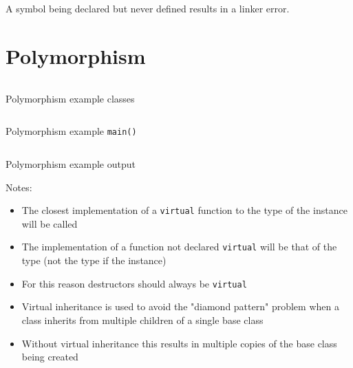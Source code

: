 \documentclass[a4paper]{article}
\begin{document}
A symbol being declared but never defined results in a linker error.

\section{Polymorphism}

\begin{listing}[h!]
  \inputminted[linenos,frame=lines,firstline=5,lastline=39]{cpp}{listings/polymorphism_1.cpp}
  \caption{Polymorphism example classes}
  \label{listing:polymorphism_1}
\end{listing}
\FloatBarrier

\begin{listing}[h!]
  \inputminted[linenos,frame=lines,firstline=41]{cpp}{listings/polymorphism_1.cpp}
  \caption{Polymorphism example \texttt{main()}}
  \label{listing:polymorphism_1_main}
\end{listing}
\FloatBarrier

\begin{listing}[h!]
  \inputminted[linenos,frame=lines]{text}{out/polymorphism_1.txt}
  \caption{Polymorphism example output}
  \label{listing:polymorphism_1_out}
\end{listing}
\FloatBarrier

Notes:

\begin{itemize}
  \item The closest implementation of a \texttt{virtual} function to the type of
        the instance will be called
  \item The implementation of a function not declared \texttt{virtual} will be
        that of the type (not the type if the instance)
  \item For this reason destructors should always be \texttt{virtual}
  \item Virtual inheritance is used to avoid the "diamond pattern" problem when
        a class inherits from multiple children of a single base class
  \item Without virtual inheritance this results in multiple copies of the base
        class being created
\end{itemize}
\end{document}
